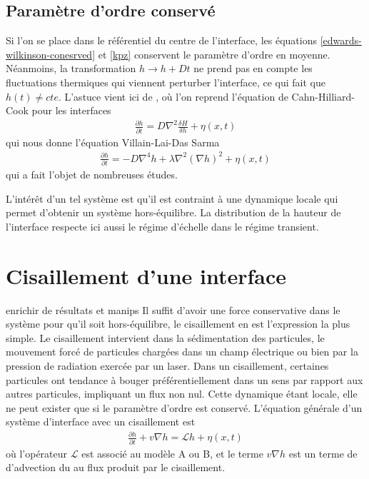     \subsection{Paramètre d'ordre conservé}

Si l'on se place dans le référentiel du centre de l'interface, les équations \ref{edwards-wilkinson-conesrved} et \ref{kpz} conservent le paramètre d'ordre en moyenne. Néanmoins, la transformation $h \rightarrow h + Dt$ ne prend pas en compte les fluctuations thermiques qui viennent perturber l'interface, ce qui fait que $h(t) \neq cte$. L'astuce vient ici de \cite{kawasaki_diffusion_1966,kawasaki_correlation-function_1966}, où l'on reprend l'équation de Cahn-Hilliard-Cook pour les interfaces
\begin{align}
    \frac{\partial h}{\partial t} = D \nabla^2 \frac{\delta H}{\delta h} +  \eta(x,t)
\end{align}
qui nous donne l'équation Villain-Lai-Das Sarma\cite{villain_continuum_1991,lai_kinetic_1991}
\begin{align}
    \frac{\partial h}{\partial t} = - D \nabla^4 h + \lambda \nabla^2 (\nabla h) ^2 +  \eta(x,t)
\end{align}
qui a fait l'objet de nombreuses études\cite{kim_conserved_1994,assis_dynamic_2015}.

L'intérêt d'un tel système est qu'il est contraint à une dynamique locale qui permet d'obtenir un système hors-équilibre. La distribution de la hauteur de l'interface respecte ici aussi le régime d'échelle  \cite{oliveira_maximal-_2008,singha_renormalization_2016} dans le régime transient. 

    \section{Cisaillement d'une interface}
{\color{red} enrichir de résultats et manips}
Il suffit d'avoir une force conservative dans le système pour qu'il soit hors-équilibre, le cisaillement en est l'expression la plus simple. Le cisaillement intervient dans la sédimentation des particules, le mouvement forcé de particules chargées dans un champ électrique ou bien par la pression de radiation exercée par un laser. 
Dans un cisaillement, certaines particules ont tendance à bouger préférentiellement dans un sens par rapport aux autres particules, impliquant un flux non nul. Cette dynamique étant locale, elle ne peut exister que si le paramètre d'ordre est conservé. L'équation générale d'un système d'interface avec un cisaillement est\cite{bray_interface_2001-1,bray_interface_2001}
\begin{align}
     \frac{\partial h}{\partial t} + v \nabla h =  \mathcal{L} h +  \eta(x,t)
     \label{eq-cisaillement}
\end{align}
où l'opérateur $\mathcal{L}$ est associé au modèle A ou B, et le terme $v \nabla h$ est un terme de d'advection du au flux produit par le cisaillement. 


